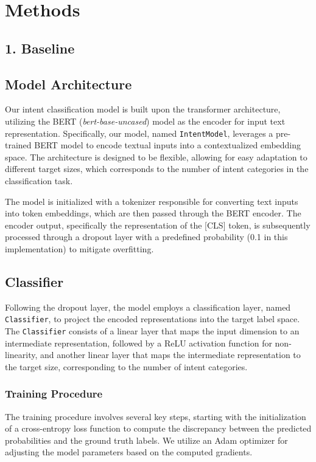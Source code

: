 \section*{Methods}

\subsection*{1. Baseline}

\subsection*{Model Architecture}
Our intent classification model is built upon the transformer architecture, utilizing the BERT (\textit{bert-base-uncased}) model as the encoder for input text representation. Specifically, our model, named \texttt{IntentModel}, leverages a pre-trained BERT model to encode textual inputs into a contextualized embedding space. The architecture is designed to be flexible, allowing for easy adaptation to different target sizes, which corresponds to the number of intent categories in the classification task.

The model is initialized with a tokenizer responsible for converting text inputs into token embeddings, which are then passed through the BERT encoder. The encoder output, specifically the representation of the [CLS] token, is subsequently processed through a dropout layer with a predefined probability (0.1 in this implementation) to mitigate overfitting.

\subsection*{Classifier}
Following the dropout layer, the model employs a classification layer, named \texttt{Classifier}, to project the encoded representations into the target label space. The \texttt{Classifier} consists of a linear layer that maps the input dimension to an intermediate representation, followed by a ReLU activation function for non-linearity, and another linear layer that maps the intermediate representation to the target size, corresponding to the number of intent categories.

\subsubsection*{Training Procedure}
The training procedure involves several key steps, starting with the initialization of a cross-entropy loss function to compute the discrepancy between the predicted probabilities and the ground truth labels. We utilize an Adam optimizer for adjusting the model parameters based on the computed gradients.

